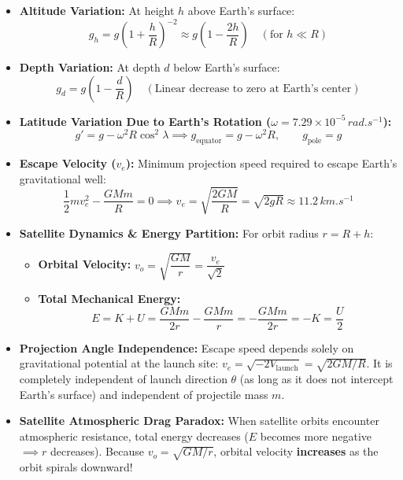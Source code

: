 \documentclass[10pt,twoside,openright]{book}
\begin{document}
\begin{usecasebox}
\begin{itemize}
  \item \textbf{Altitude Variation:} At height $h$ above Earth's surface:
  \begin{equation}
    g_h = g\left(1 + \frac{h}{R}\right)^{-2} \approx g\left(1 - \frac{2h}{R}\right) \quad (\text{for } h \ll R)
  \end{equation}
  \item \textbf{Depth Variation:} At depth $d$ below Earth's surface:
  \begin{equation}
    g_d = g\left(1 - \frac{d}{R}\right) \quad (\text{Linear decrease to zero at Earth's center})
  \end{equation}
  \item \textbf{Latitude Variation Due to Earth's Rotation ($\omega = 7.29\times 10^{-5}\,\si{rad.s^{-1}}$):}
  \begin{equation}
    g' = g - \omega^2 R\cos^2\lambda \implies g_{\text{equator}} = g - \omega^2 R, \qquad g_{\text{pole}} = g
  \end{equation}
  \item \textbf{Escape Velocity ($v_e$):} Minimum projection speed required to escape Earth's gravitational well:
  \begin{equation}
    \frac{1}{2}m v_e^2 - \frac{GMm}{R} = 0 \implies v_e = \sqrt{\frac{2GM}{R}} = \sqrt{2gR} \approx 11.2\,\si{km.s^{-1}}
  \end{equation}
  \item \textbf{Satellite Dynamics \& Energy Partition:} For orbit radius $r = R + h$:
  \begin{itemize}[leftmargin=1.2em, itemsep=2pt]
    \item \textbf{Orbital Velocity:} $v_o = \sqrt{\dfrac{GM}{r}} = \dfrac{v_e}{\sqrt{2}}$
    \item \textbf{Total Mechanical Energy:}
    \[
      E = K + U = \frac{GMm}{2r} - \frac{GMm}{r} = -\frac{GMm}{2r} = -K = \frac{U}{2}
    \]
  \end{itemize}
\end{itemize}
\end{usecasebox}

\begin{trapbox}
\begin{itemize}
  \item \textbf{Projection Angle Independence:} Escape speed depends solely on gravitational potential at the launch site: $v_e = \sqrt{-2V_{\text{launch}}} = \sqrt{2GM/R}$. It is completely independent of launch direction $\theta$ (as long as it does not intercept Earth's surface) and independent of projectile mass $m$.
  \item \textbf{Satellite Atmospheric Drag Paradox:} When satellite orbits encounter atmospheric resistance, total energy decreases ($E$ becomes more negative $\implies r$ decreases). Because $v_o = \sqrt{GM/r}$, orbital velocity \textbf{increases} as the orbit spirals downward!
\end{itemize}
\end{trapbox}
\end{document}
